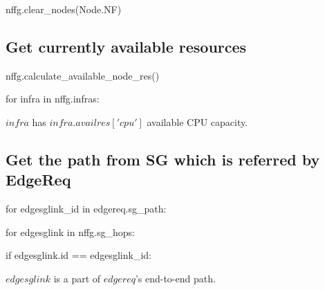 \documentclass[a4paper,10pt]{scrartcl}
\begin{document}
nffg.clear\_nodes(Node.NF)

\subsection*{Get currently available resources}

nffg.calculate\_available\_node\_res()

for infra in nffg.infras:

$infra$ has $infra.availres['cpu']$ available CPU capacity.

\subsection*{Get the path from SG which is referred by EdgeReq}

for edgesglink\_id in edgereq.sg\_path:

for edgesglink in nffg.sg\_hops:

if edgesglink.id == edgesglink\_id:

$edgesglink$ is a part of $edgereq$'s end-to-end path.
\end{document}
